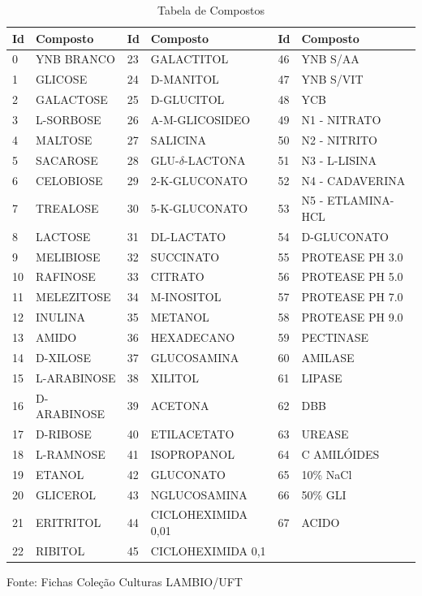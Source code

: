 \documentclass[tcc2]{classe_uftex/uftex}
\begin{document}
\begin{table}[hbt]
\caption{Tabela de Compostos}
  \label{tab:tabela02}
\begin{tabular}[c]{|l|l|l|l|l|l|}
  \hline
  \textbf{Id} & \textbf{Composto} & \textbf{Id} & \textbf{Composto} & \textbf{Id} & \textbf{Composto}\\
  \hline
    \rowcolor{LightCyan}
    0 &	YNB BRANCO & 23	& GALACTITOL	& 46	& YNB S/AA\\
    1 &	GLICOSE	& 24	& D-MANITOL	& 47	& YNB S/VIT\\
     \rowcolor{LightCyan}
    2 &	GALACTOSE	& 25	& D-GLUCITOL	& 48	& YCB\\
    3 &	L-SORBOSE	& 26	& A-M-GLICOSIDEO	& 49	& N1 - NITRATO\\
     \rowcolor{LightCyan}
    4 &	MALTOSE	& 27	& SALICINA	& 50	& N2 - NITRITO\\
    5 &	SACAROSE	& 28	& GLU-$\delta$-LACTONA	& 51	& N3 - L-LISINA\\
     \rowcolor{LightCyan}
    6 &	CELOBIOSE	& 29	& 2-K-GLUCONATO	& 52	& N4 - CADAVERINA\\
    7 &	TREALOSE	& 30	& 5-K-GLUCONATO	& 53	& N5 - ETLAMINA-HCL\\
     \rowcolor{LightCyan}
    8 &	LACTOSE	& 31	& DL-LACTATO	& 54	& D-GLUCONATO\\
    9 &	MELIBIOSE	& 32	& SUCCINATO	& 55	& PROTEASE PH 3.0\\
     \rowcolor{LightCyan}
    10 &	RAFINOSE	& 33	& CITRATO	& 56	& PROTEASE PH 5.0\\
    11 &	MELEZITOSE	& 34	& M-INOSITOL	& 57	& PROTEASE PH 7.0\\
     \rowcolor{LightCyan}
    12 &	INULINA	& 35	& METANOL	& 58	& PROTEASE PH 9.0\\
    13 &	AMIDO	& 36	& HEXADECANO	& 59	& PECTINASE\\
     \rowcolor{LightCyan}
    14 &	D-XILOSE	& 37	& GLUCOSAMINA	& 60	& AMILASE\\
    15 &	L-ARABINOSE	& 38	& XILITOL	& 61	& LIPASE\\
     \rowcolor{LightCyan}
    16 &	D-ARABINOSE	& 39	& ACETONA	& 62	& DBB\\
    17 &	D-RIBOSE	& 40	& ETILACETATO	& 63	& UREASE\\
     \rowcolor{LightCyan}
    18 &	L-RAMNOSE	& 41	& ISOPROPANOL	& 64	& C AMILÓIDES\\
    19 &	ETANOL	& 42	& GLUCONATO	& 65	& 10\% NaCl\\
     \rowcolor{LightCyan}
    20 &	GLICEROL	& 43	& NGLUCOSAMINA	& 66	& 50\% GLI\\
    21 &	ERITRITOL	& 44	& CICLOHEXIMIDA 0,01	& 67	& ACIDO\\
     \rowcolor{LightCyan}
    22 &	RIBITOL	& 45	& CICLOHEXIMIDA 0,1 &  & \\
\hline
\end{tabular}
\raggedright \scriptsize \centering Fonte: Fichas Coleção Culturas LAMBIO/UFT
\end{table}
\end{document}
